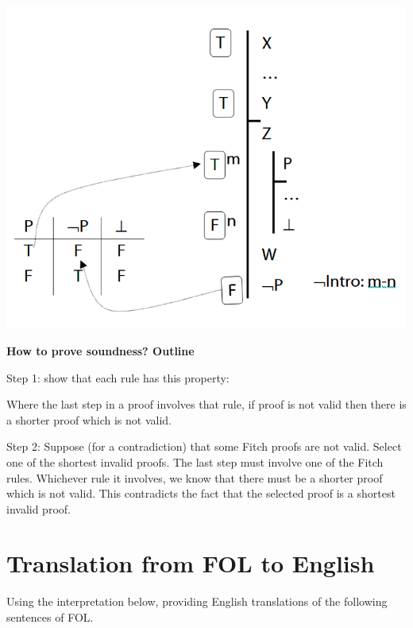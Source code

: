 \documentclass[12pt]{extarticle}
\begin{document}
\begin{multicols*}{3}
\begin{minipage}{\columnwidth}
\begin{center}
\includegraphics[scale=0.3]{img/soundness_not.png}
\end{center}
\end{minipage}
 
\begin{minipage}{\columnwidth}
 
\textbf{How to prove soundness? Outline}
 
Step 1: show that each rule has this property:
 
\hspace{5mm} Where the last step in a proof involves that rule, if proof is not valid then there is a shorter proof which is not valid.
 
Step 2: Suppose (for a contradiction) that some Fitch proofs are not valid. Select one of the shortest invalid proofs. The last step must involve one of the Fitch rules. Whichever rule it involves, we know that there must be a shorter proof which is not valid. This contradicts the fact that the selected proof is a shortest invalid proof.
 
\end{minipage}
 
 
 
\section{Translation from FOL to English}
 
Using the interpretation below, providing English translations of the following sentences of FOL.
 

\end{multicols*}
\end{document}
